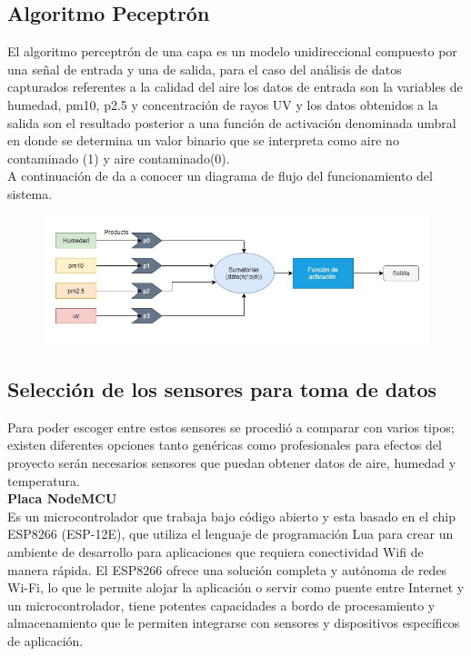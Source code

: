 \documentclass[10pt,a4paper]{article}
\begin{document}
\subsection{Algoritmo Peceptrón}

El algoritmo perceptrón de una capa es un modelo unidireccional compuesto por una señal de entrada y una de salida, para el caso del análisis de datos capturados referentes a la calidad del aire los datos de entrada son la variables de humedad, pm10, p2.5 y concentración de rayos UV y los datos obtenidos a la salida son el resultado posterior a una función de activación denominada umbral en donde se determina un valor binario que se interpreta como aire no contaminado (1) y aire contaminado(0).\\
A continuación de da a conocer un diagrama de flujo del funcionamiento del sistema.\\
\begin{figure}[H]
\centering
 \includegraphics[scale=0.7]{bloquePerceptron.JPG} 
\end{figure}

\subsection{Selección de los sensores para toma de datos}

Para poder escoger entre estos sensores se procedió a comparar con varios tipos; existen diferentes opciones tanto genéricas como profesionales para efectos del proyecto serán necesarios sensores que puedan obtener datos de aire, humedad y temperatura.\\

\textbf{Placa NodeMCU}\\

Es un microcontrolador que trabaja bajo código abierto y esta basado en el chip ESP8266 (ESP-12E), que utiliza el lenguaje de programación Lua para crear un ambiente de desarrollo para aplicaciones que requiera conectividad Wifi de manera rápida.
El ESP8266 ofrece una solución completa y autónoma de redes Wi-Fi, lo que le permite alojar la aplicación o servir como puente entre Internet y un microcontrolador, tiene potentes capacidades a bordo de procesamiento y almacenamiento que le permiten integrarse con sensores y dispositivos específicos de aplicación.\\
\end{document}
